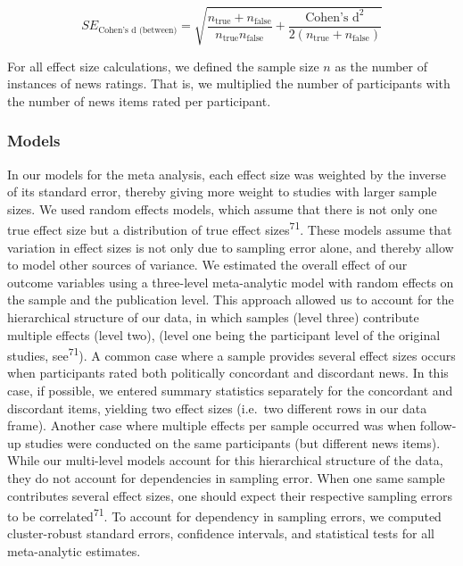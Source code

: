 \documentclass[
  man]{apa6}
\begin{document}
\[
SE_{\text{Cohen's d (between)}} = \sqrt{\frac{n_{\text{true}}+n_{\text{false}}}{n_{\text{true}}n_{\text{false}}}+\frac{\text{Cohen's d}^2}{2(n_{\text{true}}+n_{\text{false}})}}
\]

For all effect size calculations, we defined the sample size \(n\) as the number of instances of news ratings. That is, we multiplied the number of participants with the number of news items rated per participant.

\subsubsection{Models}\label{models}

In our models for the meta analysis, each effect size was weighted by the inverse of its standard error, thereby giving more weight to studies with larger sample sizes. We used random effects models, which assume that there is not only one true effect size but a distribution of true effect sizes\textsuperscript{71}. These models assume that variation in effect sizes is not only due to sampling error alone, and thereby allow to model other sources of variance. We estimated the overall effect of our outcome variables using a three-level meta-analytic model with random effects on the sample and the publication level. This approach allowed us to account for the hierarchical structure of our data, in which samples (level three) contribute multiple effects (level two), (level one being the participant level of the original studies, see\textsuperscript{71}). A common case where a sample provides several effect sizes occurs when participants rated both politically concordant and discordant news. In this case, if possible, we entered summary statistics separately for the concordant and discordant items, yielding two effect sizes (i.e.~two different rows in our data frame). Another case where multiple effects per sample occurred was when follow-up studies were conducted on the same participants (but different news items). While our multi-level models account for this hierarchical structure of the data, they do not account for dependencies in sampling error. When one same sample contributes several effect sizes, one should expect their respective sampling errors to be correlated\textsuperscript{71}. To account for dependency in sampling errors, we computed cluster-robust standard errors, confidence intervals, and statistical tests for all meta-analytic estimates.
\end{document}

